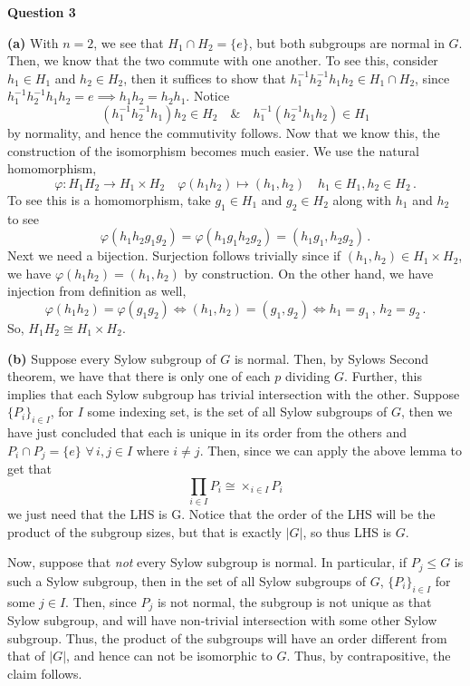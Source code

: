 \documentclass[10pt]{article}
\begin{document}
\newpage
\textbf{Question 3}

\textbf{(a)} With $n= 2$, we see that $H_{1}\cap H_{2} = \{e\}$, but both subgroups are normal in $G$. Then, we know that the two commute with one another. To see this, consider $h_{1}\in H_{1}$ and $h_{2}\in H_{2}$, then it suffices to show that $h_{1}^{-1}h_{2}^{-1}h_{1}h_{2} \in H_{1}\cap H_{2}$, since $h_{1}^{-1}h_{2}^{-1}h_{1}h_{2} = e \implies h_{1}h_{2} = h_{2}h_{1}$. Notice
\[ (h_{1}^{-1}h_{2}^{-1}h_{1})h_{2} \in H_{2} \quad \& \quad h_{1}^{-1}(h_{2}^{-1}h_{1}h_{2}) \in H_{1} \]
by normality, and hence the commutivity follows. Now that we know this, the construction of the isomorphism becomes much easier. We use the natural homomorphism,
\[ \varphi: H_{1}H_{2} \to H_{1} \times H_{2} \quad \varphi(h_{1}h_{2})\mapsto (h_{1},h_{2}) \quad h_{1}\in H_{1}, h_{2}\in H_{2} \, .\]
To see this is a homomorphism, take $g_{1}\in H_{1}$ and $g_{2}\in H_{2}$ along with $h_{1}$ and $h_{2}$ to see
\[ \varphi(h_{1}h_{2}g_{1}g_{2}) = \varphi(h_{1}g_{1}h_{2}g_{2}) = (h_{1}g_{1},h_{2}g_{2}) \, .\]
Next we need a bijection. Surjection follows trivially since if $(h_{1},h_{2})\in H_{1}\times H_{2}$, we have $\varphi(h_{1}h_{2}) = (h_{1},h_{2})$ by construction. On the other hand, we have injection from definition as well,
\[ \varphi(h_{1}h_{2}) = \varphi(g_{1}g_{2}) \iff (h_{1},h_{2}) = (g_{1},g_{2}) \iff h_{1}=g_{1} \,,\, h_{2} = g_{2} \, .\]
So, $H_{1}H_{2} \cong H_{1}\times H_{2}$.

\textbf{(b)} Suppose every Sylow subgroup of $G$ is normal. Then, by Sylows Second theorem, we have that there is only one of each $p$ dividing $G$. Further, this implies that each Sylow subgroup has trivial intersection with the other. Suppose $\{P_{i}\}_{i\in I}$, for $I$ some indexing set, is the set of all Sylow subgroups of $G$, then we have just concluded that each is unique in its order from the others and $P_{i}\cap P_{j} = \{e\}$ $\forall \, i,j\in I$ where $i\neq j$. Then, since we can apply the above lemma to get that
\[\prod_{i\in I}P_{i} \cong \times_{i\in I}P_{i} \]
we just need that the LHS is G. Notice that the order of the LHS will be the product of the subgroup sizes, but that is exactly $|G|$, so thus LHS is $G$.

Now, suppose that \textit{not} every Sylow subgroup is normal. In particular, if $P_{j} \leq G$ is such a Sylow subgroup, then in the set of all Sylow subgroups of $G$, $\{P_{i}\}_{i\in I}$ for some $j\in I$. Then, since $P_{j}$ is not normal, the subgroup is not unique as that Sylow subgroup, and will have non-trivial intersection with some other Sylow subgroup. Thus, the product of the subgroups will have an order different from that of $|G|$, and hence can not be isomorphic to $G$. Thus, by contrapositive, the claim follows.
\end{document}
